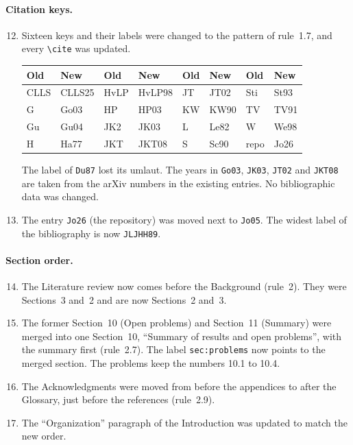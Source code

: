 \documentclass[12pt,letterpaper]{article}
\begin{document}
\paragraph{Citation keys.}
\begin{enumerate}
\setcounter{enumi}{11}
\item Sixteen keys and their labels were changed to the pattern of rule~1.7, and
every \verb|\cite| was updated.
\begin{center}\small\ttfamily
\begin{tabular}{@{}ll@{\qquad}ll@{\qquad}ll@{\qquad}ll@{}}
\toprule
\rmfamily Old & \rmfamily New & \rmfamily Old & \rmfamily New & \rmfamily Old & \rmfamily New & \rmfamily Old & \rmfamily New\\
\midrule
CLLS & CLLS25 & HvLP & HvLP98 & JT & JT02 & Sti & St93\\
G & Go03 & HP & HP03 & KW & KW90 & TV & TV91\\
Gu & Gu04 & JK2 & JK03 & L & Le82 & W & We98\\
H & Ha77 & JKT & JKT08 & S & Sc90 & repo & Jo26\\
\bottomrule
\end{tabular}
\end{center}
The label of \texttt{Du87} lost its umlaut. The years in \texttt{Go03},
\texttt{JK03}, \texttt{JT02} and \texttt{JKT08} are taken from the arXiv numbers
in the existing entries. No bibliographic data was changed.
\item The entry \texttt{Jo26} (the repository) was moved next to \texttt{Jo05}.
The widest label of the bibliography is now \texttt{JLJHH89}.
\end{enumerate}

\paragraph{Section order.}
\begin{enumerate}
\setcounter{enumi}{13}
\item The Literature review now comes before the Background (rule~2). They were
Sections~3 and~2 and are now Sections~2 and~3.
\item The former Section~10 (Open problems) and Section~11 (Summary) were merged
into one Section~10, ``Summary of results and open problems'', with the summary
first (rule~2.7). The label \texttt{sec:problems} now points to the merged
section. The problems keep the numbers 10.1 to 10.4.
\item The Acknowledgments were moved from before the appendices to after the
Glossary, just before the references (rule~2.9).
\item The ``Organization'' paragraph of the Introduction was updated to match
the new order.
\end{enumerate}
\end{document}

